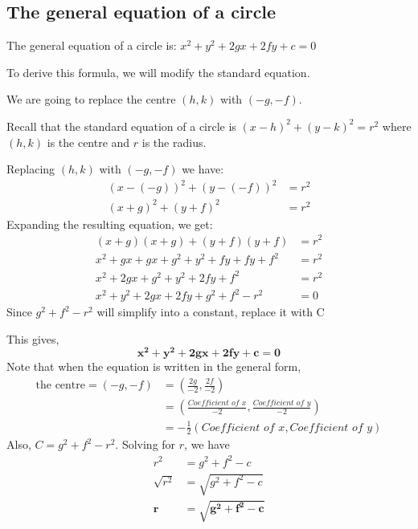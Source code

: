 \subsection{The general equation of a circle}

The general equation of a circle is: $x^2 + y^2 + 2gx + 2fy + c = 0$

To derive this formula, we will modify the standard equation.

We are going to replace the centre $(h, k)$ with $(-g, -f)$.

Recall that the standard equation of a circle is $(x - h)^2 + (y - k)^2 = r^2$ where $(h, k)$
is the centre and $r$ is the radius.

Replacing $(h, k)$ with $(-g, -f)$ we have:
\begin{align*}
(x - (-g))^2 + (y - (-f))^2 &= r^2 \\
(x + g)^2 + (y + f)^2 &= r^2
\end{align*}
Expanding the resulting equation, we get:
\begin{align*}
(x + g)(x + g) + (y + f)(y + f) &= r^2 \\
x^2 + gx + gx + g^2 + y^2 + fy + fy + f^2 &= r^2 \\
x^2 + 2gx + g^2 + y^2 + 2fy + f^2 &= r^2 \\
x^2 + y^2 + 2gx + 2fy + g^2 + f^2 - r^2 &= 0
\end{align*}
Since $g^2 + f^2 - r^2$ will simplify into a constant, replace it with C

This gives,
\[ \boldsymbol{x^2 + y^2 + 2gx + 2fy + c = 0} \]
Note that when the equation is written in the general form,
\begin{align*}
\text{the centre} = (-g, -f) &= \left(\frac{2g}{-2}, \frac{2f}{-2}\right) \\
&= \left(\frac{\textit{Coefficient of } x}{-2}, \frac{\textit{Coefficient of } y}{-2}\right) \\
&= -\frac{1}{2}(\textit{Coefficient of } x, \textit{Coefficient of } y)
\end{align*}
Also, $C = g^2 + f^2 - r^2$. Solving for $r$, we have
\begin{align*}
r^2 &= g^2 + f^2 - c \\
\sqrt{r^2} &= \sqrt{g^2 + f^2 - c} \\
\boldsymbol{r} &= \boldsymbol{\sqrt{g^2 + f^2 - c}}
\end{align*}

